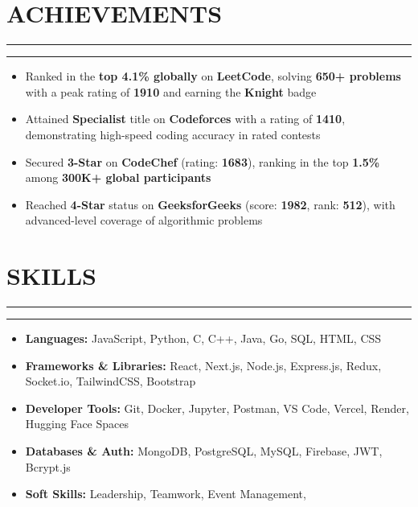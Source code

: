 \documentclass[a4paper]{article}
\newcommand{\sectionline}{
  \vspace{-2em} %
  \noindent\rule{\textwidth}{0.4pt}
  \vspace{0em} %
}
\newcommand{\verticalInd}{
  \vspace{-0.9em} %
  \noindent\rule{\textwidth}{0pt}
  \vspace{0em} %
}
\newcommand{\sectionlineP}{
  \vspace{-2em} %
  \noindent\rule{\textwidth}{0.4pt}
  \vspace{-2em} %
}
\begin{document}
\vspace{-1.25em}

\section*{ACHIEVEMENTS}
\sectionlineP
\verticalInd
\begin{itemize}[leftmargin=*]
    \item Ranked in the \textbf{top 4.1\% globally} on \textbf{LeetCode}, solving \textbf{650+ problems} with a peak rating of \textbf{1910} and earning the \textbf{Knight} badge
    \vspace{-0.5em}

    \item Attained \textbf{Specialist} title on \textbf{Codeforces} with a rating of \textbf{1410}, demonstrating high-speed coding accuracy in rated contests
    \vspace{-0.5em}

    \item Secured \textbf{3-Star} on \textbf{CodeChef} (rating: \textbf{1683}), ranking in the top \textbf{1.5\%} among \textbf{300K+ global participants}
    \vspace{-0.5em}

    \item Reached \textbf{4-Star} status on \textbf{GeeksforGeeks} (score: \textbf{1982}, rank: \textbf{512}), with advanced-level coverage of algorithmic problems
\end{itemize}

\vspace{-1.25em}

\section*{SKILLS}
\sectionline
\verticalInd
\vspace{-2em}
\begin{itemize}[leftmargin=*]
    \item \textbf{Languages:} JavaScript, Python, C, C++, Java, Go, SQL, HTML, CSS 
    \vspace{-0.5em}
    \item \textbf{Frameworks \& Libraries:} React, Next.js, Node.js, Express.js, Redux, Socket.io, TailwindCSS, Bootstrap 
    \vspace{-0.5em}
    \item \textbf{Developer Tools:} Git, Docker, Jupyter, Postman, VS Code, Vercel, Render, Hugging Face Spaces
    \vspace{-0.5em}
    \item \textbf{Databases \& Auth:} MongoDB, PostgreSQL, MySQL, Firebase, JWT, Bcrypt.js
    \vspace{-0.5em}
    \item \textbf{Soft Skills:} Leadership, Teamwork, Event Management, 
    \vspace{-0.5em}
\end{itemize}
\end{document}
